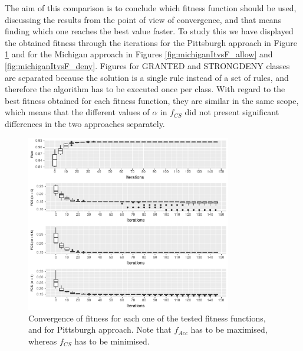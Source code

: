 \documentclass[runningheads]{llncs}
\begin{document}

\label{subsec:fitnesscomparison}

The aim of this comparison is to conclude which fitness function should be used, discussing the results from the point of view of convergence, and that means finding which one reaches the best value faster. To study this we have displayed the obtained fitness through the iterations for the Pittsburgh approach in Figure \ref{fig:pittsburghItvsF} and for the Michigan approach in Figures \ref{fig:michiganItvsF_allow} and \ref{fig:michiganItvsF_deny}. Figures for GRANTED and STRONGDENY classes are separated because the solution is a single rule instead of a set of rules, and therefore the algorithm has to be executed once per class. With regard to the best fitness obtained for each fitness function, they are similar in the same scope, which means that the different values of $\alpha$ in $f_{CS}$ did not present significant differences in the two approaches separately.

\begin{figure}[h!tb]
\centering
\includegraphics[width=0.8\textwidth]{img/pittsburghItvsF.pdf}
\caption{Convergence of fitness for each one of the tested fitness
  functions, and for Pittsburgh approach. Note that $f_{Acc}$ has to
  be maximised, whereas $f_{CS}$ has to be minimised.}
\label{fig:pittsburghItvsF}
\end{figure}
\end{document}
